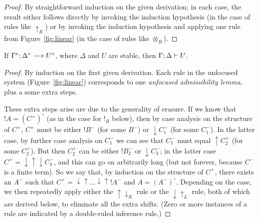 \begin{proof}
  By straightforward induction on the given derivation; in each case,
  the result either follows directly by invoking the induction
  hypothesis (in the case of rules like ${\uparrow}_R$) or by invoking
  the induction hypothesis and applying one rule from
  Figure~\ref{fig:linear} (in the case of rules like ${\otimes}_R$).
\end{proof}

\begin{theorem}\label{thm:linfoccomplete}
If ${\Gamma^\circ};{\Delta^\circ} \longrightarrow {U^\circ} \mathstrut$, where $\Delta$ and $U$ are
stable,
then ${\Gamma};{\Delta} \vdash {U} \mathstrut$. 
\end{theorem}

\begin{proof}
  By induction on the first given derivation. Each rule in the
  unfocused system (Figure~\ref{fig:linear}) corresponds to one {\it
    unfocused admissibility lemma}, plus a some extra steps.

  These extra steps arise are due to the generality of erasure. If we
  know that ${!}A = (C^+)^\circ$ (as in the case for ${!}_R$ below),
  then by case analysis on the structure of $C^+$, $C^+$ must be
  either ${!}B^-$ (for some $B^-$) or ${\downarrow}C_1^-$ (for some
  $C_1^-$). In the latter case, by further case analysis on $C_1^-$ we
  can see that $C_1^-$ must equal ${\uparrow}C_2^+$ (for some
  $C_2^+$). But then $C_2^+$ can be either ${!}B_2^-$ or
  ${\downarrow}C_3^-$; in the latter case $C^+ =
  {\downarrow}{\uparrow}{\downarrow}C_3^-$, and this can go on
  arbitrarily long (but not forever, because $C^-$ is a finite
  term). So we say that, by induction on the structure of $C^+$, there
  exists an $A^-$ such that $C^+ =
  {\downarrow}{\uparrow}\ldots{\downarrow}{\uparrow}{!}A^-$ and $A =
  (A^-)^\circ$. Depending on the case, we then repeatedly apply either
  the ${\uparrow}{\downarrow}_R$ rule or the ${\downarrow}{\uparrow}_L$
  rule,
  both of which are derived below, to eliminate all the extra shifts.
  (Zero or more instances of a rule are indicated by a double-ruled
  inference rule.)


\end{proof}
